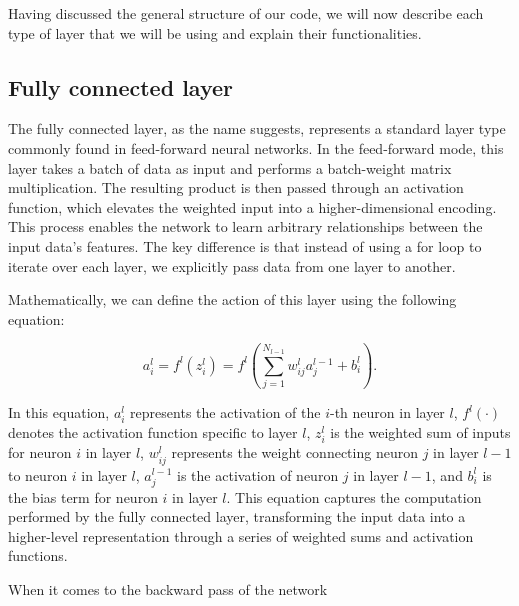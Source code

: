 \documentclass[onecolumn,10pt,cleanfoot]{asme2ej}
\begin{document}
Having discussed the general structure of our code, we will now describe each type of layer that we will be using and explain their functionalities.

\subsection{Fully connected layer}
The fully connected layer, as the name suggests, represents a standard layer type commonly found in feed-forward neural networks. In the feed-forward mode, this layer takes a batch of data as input and performs a batch-weight matrix multiplication. The resulting product is then passed through an activation function, which elevates the weighted input into a higher-dimensional encoding. This process enables the network to learn arbitrary relationships between the input data's features. The key difference is that instead of using a for loop to iterate over each layer, we explicitly pass data from one layer to another.

Mathematically, we can define the action of this layer using the following equation:

\begin{equation}
a_i^l = f^l(z_i^l) = f^l\left(\sum_{j=1}^{N_{l-1}} w_{ij}^l a_j^{l-1} + b_i^l\right).
\end{equation}

In this equation, $a_i^l$ represents the activation of the $i$-th neuron in layer $l$, $f^l(\cdot)$ denotes the activation function specific to layer $l$, $z_i^l$ is the weighted sum of inputs for neuron $i$ in layer $l$, $w_{ij}^l$ represents the weight connecting neuron $j$ in layer $l-1$ to neuron $i$ in layer $l$, $a_j^{l-1}$ is the activation of neuron $j$ in layer $l-1$, and $b_i^l$ is the bias term for neuron $i$ in layer $l$. This equation captures the computation performed by the fully connected layer, transforming the input data into a higher-level representation through a series of weighted sums and activation functions.

When it comes to the backward pass of the network
\end{document}
